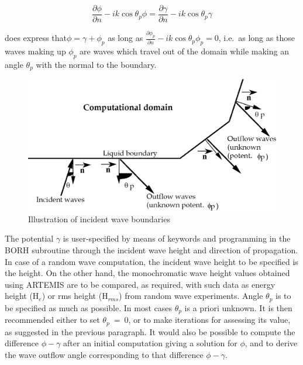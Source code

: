 \begin{equation}
  \frac{\partial \phi}{\partial n} - ik\cos\theta_p\phi =
  \frac{\partial \gamma}{\partial n} - ik\cos\theta_p\gamma
  \label{eq:3.61}
\end{equation}

does express that$\phi  = \gamma + \phi_p$ as long as $\frac{\partial
\phi_p}{\partial n}-ik\cos\theta_p\phi_p = 0$, i.e.\ as long as those waves
making up $\phi_{p}$ are waves which travel out of the domain while making an
angle $\theta_{p}$ with the normal to the boundary.

\begin{figure}[H]%
\begin{center}
%
  \includegraphics[width=\textwidth]{./graphics/incid_wave}
%
\caption{Illustration of incident wave boundaries}\label{fig:incid_wave}
\end{center}
\end{figure}

The potential $\gamma$ is user-specified by means of keywords and programming in
the BORH subroutine through the incident wave height and direction of
propagation. In case of a random wave computation, the incident wave height to
be specified is the  height. On the other hand, the
monochromatic wave height values obtained using ARTEMIS are to be compared, as
required, with such data as energy height (H${}_{e}$) or rms height
(H${}_{rms}$) from random wave experiments. Angle $\theta_{p}$ is to be
specified as much as possible. In most cases $\theta_{p}$ is a priori unknown.
It is then recommended either to set $\theta_{p}$~=~0, or to make iterations
for assessing its value, as suggested in the previous paragraph. It would also
be possible to compute the difference $\phi - \gamma$ after an initial
computation giving a solution for $\phi$, and to derive the wave outflow angle
corresponding to that difference $\phi - \gamma$.


